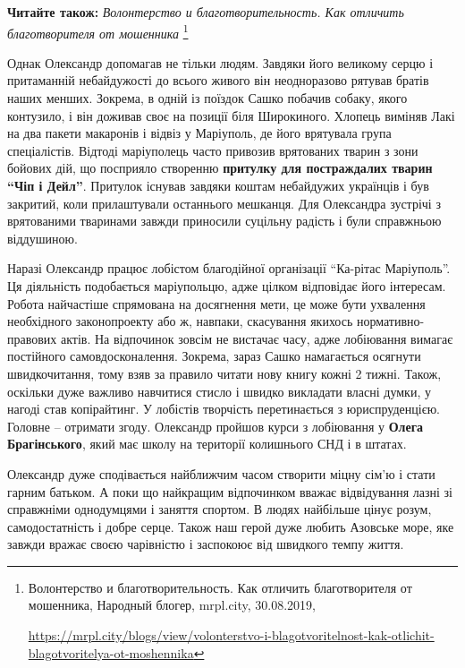 \textbf{Читайте також:} \emph{Волонтерство и благотворительность. Как отличить благотворителя от мошенника}%
\footnote{Волонтерство и благотворительность. Как отличить благотворителя от мошенника, Народный блогер, mrpl.city, 30.08.2019, \par%
\url{https://mrpl.city/blogs/view/volonterstvo-i-blagotvoritelnost-kak-otlichit-blagotvoritelya-ot-moshennika}
}


Однак Олександр допомагав не тільки людям. Завдяки його великому серцю і
притаманній небайдужості до всього живого він неодноразово рятував братів наших
менших. Зокрема, в одній із поїздок Сашко побачив собаку, якого контузило, і
він доживав своє на позиції біля Широкиного. Хлопець виміняв Лакі на два пакети
макаронів і відвіз у Маріуполь, де його врятувала група спеціалістів. Відтоді
маріуполець часто привозив врятованих тварин з зони бойових дій, що посприяло
створенню \textbf{притулку для постраждалих тварин \enquote{Чіп і Дейл}}. Притулок існував
завдяки коштам небайдужих українців і був закритий, коли прилаштували
останнього мешканця. Для Олександра зустрічі з врятованими тваринами завжди
приносили суцільну радість і були справжньою віддушиною.


Наразі Олександр працює лобістом благодійної організації \enquote{Ка\hyp{}рітас
Маріуполь}.  Ця діяльність подобається маріупольцю, адже цілком відповідає його
інтересам.  Робота найчастіше спрямована на досягнення мети, це може бути
ухвалення необхідного законопроекту або ж, навпаки, скасування якихось
нормативно-правових актів. На відпочинок зовсім не вистачає часу, адже
лобіювання вимагає постійного самовдосконалення. Зокрема, зараз Сашко
намагається осягнути швидкочитання, тому взяв за правило читати нову книгу
кожні 2 тижні. Також, оскільки дуже важливо навчитися стисло і швидко викладати
власні думки, у нагоді став копірайтинг. У лобістів творчість перетинається з
юриспруденцією. Головне – отримати згоду. Олександр пройшов курси з лобіювання
у \textbf{Олега Брагінського}, який має школу на території колишнього СНД і в
штатах.


Олександр дуже сподівається найближчим часом створити міцну сім'ю і стати
гарним батьком. А поки що найкращим відпочинком вважає відвідування лазні зі
справжніми однодумцями і заняття спортом. В людях найбільше цінує розум,
самодостатність і добре серце. Також наш герой дуже любить Азовське море, яке
завжди вражає своєю чарівністю і заспокоює від швидкого темпу життя.

